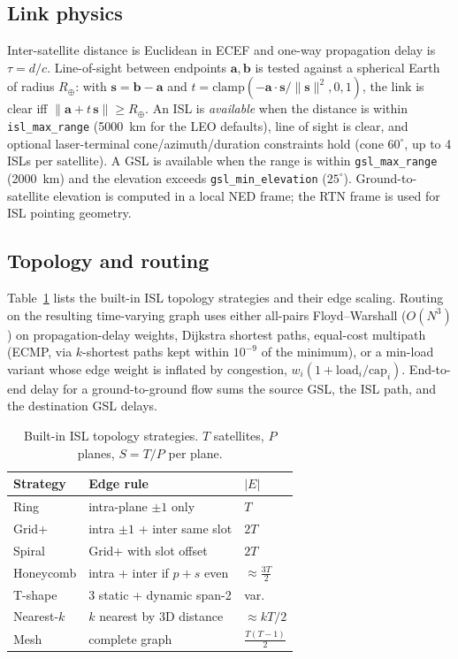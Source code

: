 \documentclass[10pt,twocolumn]{article}
\newcommand{\code}[1]{\texttt{\small #1}}
\begin{document}
\subsection{Link physics}
Inter-satellite distance is Euclidean in ECEF and one-way propagation delay is
$\tau = d/c$. Line-of-sight between endpoints $\mathbf a,\mathbf b$ is tested
against a spherical Earth of radius $R_\oplus$: with $\mathbf
s=\mathbf b-\mathbf a$ and $t=\mathrm{clamp}(-\mathbf a\!\cdot\!\mathbf
s/\lVert\mathbf s\rVert^2,0,1)$, the link is clear iff $\lVert \mathbf a + t\,\mathbf
s\rVert \ge R_\oplus$. An ISL is \emph{available} when the distance is within
\code{isl\_max\_range} (5000~km for the LEO defaults), line of sight is clear,
and optional laser-terminal cone/azimuth/duration constraints hold (cone
$60^\circ$, up to 4 ISLs per satellite). A GSL is available when the range is
within \code{gsl\_max\_range} (2000~km) and the elevation exceeds
\code{gsl\_min\_elevation} ($25^\circ$). Ground-to-satellite elevation is
computed in a local NED frame; the RTN frame is used for ISL pointing geometry.

\subsection{Topology and routing}
Table~\ref{tab:topo} lists the built-in ISL topology strategies and their edge
scaling. Routing on the resulting time-varying graph uses either all-pairs
Floyd--Warshall ($O(N^3)$) on propagation-delay weights, Dijkstra shortest paths,
equal-cost multipath (ECMP, via $k$-shortest paths kept within $10^{-9}$ of the
minimum), or a min-load variant whose edge weight is inflated by congestion,
$w_i(1+\text{load}_i/\text{cap}_i)$. End-to-end delay for a ground-to-ground flow
sums the source GSL, the ISL path, and the destination GSL delays.

\begin{table}[t]
\centering
\caption{Built-in ISL topology strategies. $T$ satellites, $P$ planes,
$S=T/P$ per plane.}
\label{tab:topo}
\small
\begin{tabular}{@{}lll@{}}
\toprule
\textbf{Strategy} & \textbf{Edge rule} & \textbf{$|E|$} \\
\midrule
Ring          & intra-plane $\pm1$ only              & $T$ \\
Grid+         & intra $\pm1$ + inter same slot       & $2T$ \\
Spiral        & Grid+ with slot offset               & $2T$ \\
Honeycomb     & intra + inter if $p{+}s$ even        & ${\approx}\tfrac{3T}{2}$ \\
T-shape       & 3 static + dynamic span-2            & var. \\
Nearest-$k$   & $k$ nearest by 3D distance           & ${\approx}kT/2$ \\
Mesh          & complete graph                       & $\tfrac{T(T{-}1)}{2}$ \\
\bottomrule
\end{tabular}
\end{table}
\end{document}
